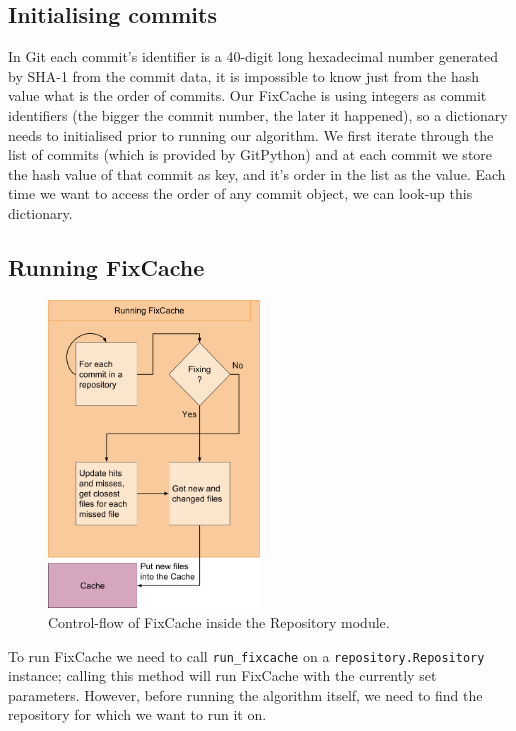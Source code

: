 \documentclass[12pt,twoside,notitlepage]{report}
\newcommand{\fxch}{FixCache}
\begin{document}
\subsection{Initialising commits} In Git each commit's identifier is a 40-digit long hexadecimal number generated by SHA-1 from the commit data, it is impossible to know just from the hash value what is the order of commits. Our \fxch{} is using integers as commit identifiers (the bigger the commit number, the later it happened), so a dictionary needs to initialised prior to running our algorithm. We first iterate through the list of commits (which is provided by GitPython) and at each commit we store the hash value of that commit as key, and it's order in the list as the value. Each time we want to access the order of any commit object, we can look-up this dictionary.
\clearpage
\subsection{Running \fxch{}}
\begin{figure}
\begin{center}
\vspace{-16pt}
\includegraphics[width=0.5\textwidth]{repository_module.png}
\end{center}
\caption{Control-flow of \fxch{} inside the Repository module.}
\label{run_fxch}
\end{figure}
To run \fxch{} we need to call \texttt{run\_fixcache} on a \texttt{repository.Repository} instance; calling this method will run \fxch{} with the currently set parameters. However, before running the algorithm itself, we need to find the repository for which we want to run it on.
\end{document}
